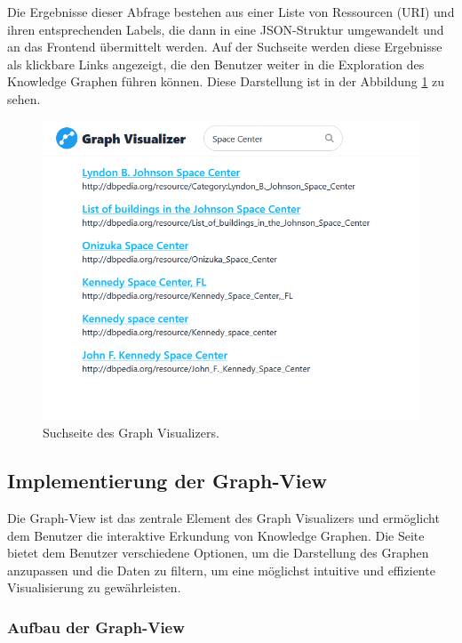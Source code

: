 Die Ergebnisse dieser Abfrage bestehen aus einer Liste von Ressourcen (URI) und ihren entsprechenden Labels, die dann in eine JSON-Struktur umgewandelt und an das Frontend übermittelt werden. Auf der Suchseite werden diese Ergebnisse als klickbare Links angezeigt, die den Benutzer weiter in die Exploration des Knowledge Graphen führen können. Diese Darstellung ist in der Abbildung \ref{fig:realization:implementation:searchpage} zu sehen.

\begin{figure}[h]
    \centering
    \includegraphics[height=.8\textwidth]{images/03/SearchResults.png}
    \caption{Suchseite des Graph Visualizers.}
    \label{fig:realization:implementation:searchpage}
\end{figure}

\subsection{Implementierung der Graph-View}

Die Graph-View ist das zentrale Element des Graph Visualizers und ermöglicht dem Benutzer die interaktive Erkundung von Knowledge Graphen. Die Seite bietet dem Benutzer verschiedene Optionen, um die Darstellung des Graphen anzupassen und die Daten zu filtern, um eine möglichst intuitive und effiziente Visualisierung zu gewährleisten.

\subsubsection{Aufbau der Graph-View}

